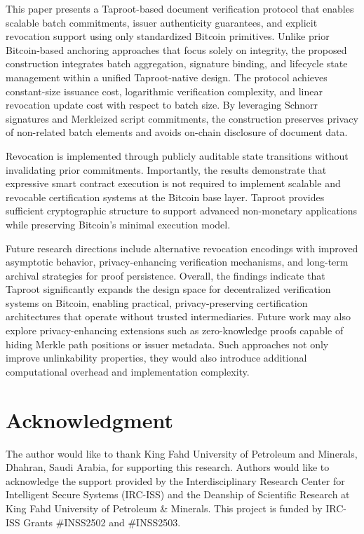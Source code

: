 \documentclass[preprint,12pt]{elsarticle}
\begin{document}
This paper presents a Taproot-based document verification protocol that enables scalable batch commitments, issuer authenticity guarantees, and explicit revocation support using only standardized Bitcoin primitives. Unlike prior Bitcoin-based anchoring approaches that focus solely on integrity, the proposed construction integrates batch aggregation, signature binding, and lifecycle state management within a unified Taproot-native design. The protocol achieves constant-size issuance cost, logarithmic verification complexity, and linear revocation update cost with respect to batch size. By leveraging Schnorr signatures and Merkleized script commitments, the construction preserves privacy of non-related batch elements and avoids on-chain disclosure of document data. 

Revocation is implemented through publicly auditable state transitions without invalidating prior commitments. Importantly, the results demonstrate that expressive smart contract execution is not required to implement scalable and revocable certification systems at the Bitcoin base layer. 
Taproot provides sufficient cryptographic structure to support advanced non-monetary applications while preserving Bitcoin’s minimal execution model. 

Future research directions include alternative revocation encodings with improved asymptotic behavior, privacy-enhancing verification mechanisms, and long-term archival strategies for proof persistence. Overall, the findings indicate that Taproot significantly expands the design space for decentralized verification systems on Bitcoin, enabling practical, privacy-preserving certification architectures that operate without trusted intermediaries.
Future work may also explore privacy-enhancing extensions such as zero-knowledge proofs capable of hiding Merkle path positions or issuer metadata. 
Such approaches not only improve unlinkability properties, they would also introduce additional computational overhead and implementation complexity.

\section*{Acknowledgment}
The author would like to thank King Fahd University of Petroleum and Minerals, Dhahran, Saudi Arabia, for supporting this research. 
Authors would like to acknowledge the support provided by the Interdisciplinary Research Center for Intelligent Secure Systems (IRC-ISS) and the Deanship of Scientific Research at King Fahd University of Petroleum \& Minerals. This project is funded by IRC-ISS Grants
\#INSS2502 and \#INSS2503.




\end{document}
